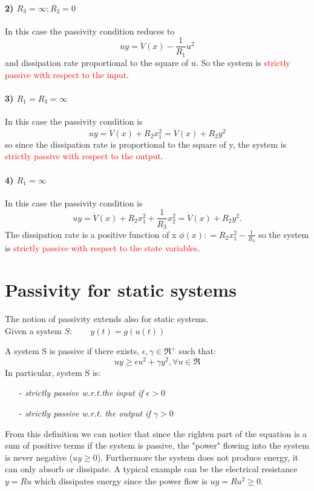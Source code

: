 \paragraph{2) $R_3=\infty; R_2=0$} In this case the passivity condition reduces to \[uy=\dot{V}(x)-\frac{1}{R_1}u^2\] and dissipation rate proportional to the square of u. So the system is \textcolor{red}{strictly passive with respect to the input}.
\paragraph{3) $R_1=R_3=\infty$} In this case the passivity condition is \[uy=\dot{V}(x)+R_2x_1^2=\dot{V}(x)+R_2y^2\] so since the dissipation rate is proportional to the square of y, the system is \textcolor{red}{strictly passive with respect to the output}.
\paragraph{4) $R_1=\infty$} In this case the passivity condition is \[uy=\dot{V}(x)+R_2x_1^2+\frac{1}{R_3}x_2^2=\dot{V}(x)+R_2y^2.\] The dissipation rate is a positive function of x $\phi(x)\colon=R_2x_1^2-\frac{1}{R_3}$ so the system is \textcolor{red}{strictly passive with respect to the state variables}.
\section{Passivity for static systems}
The notion of passivity extends also for static systems.\\
Given a system $S:\qquad y(t)=g(u(t))$
\begin{defn}
	A system S is passive if there exists, $\epsilon,\gamma \in \Re^+$ such that: \[uy \ge\epsilon u^2+\gamma y^2, \forall u \in \Re\]
	In particular, system  S is:
	\begin{itemize}
		\item[-] \emph{strictly passive w.r.t.the input if $\epsilon>0$}
		\item[-] \emph{strictly passive w.r.t. the output if $\gamma>0$}
	\end{itemize} 
\end{defn} 
From this definition we can notice that since the righten part of the equation is a sum of positive terms if the system is passive, the "power" flowing into the system is never negative ($uy\ge 0$). Furthermore the system does not produce energy, it can only absorb or dissipate. A typical example can be the electrical resistance $y=Ru$ which dissipates energy since the power flow is $uy=Ru^2\ge 0$.
